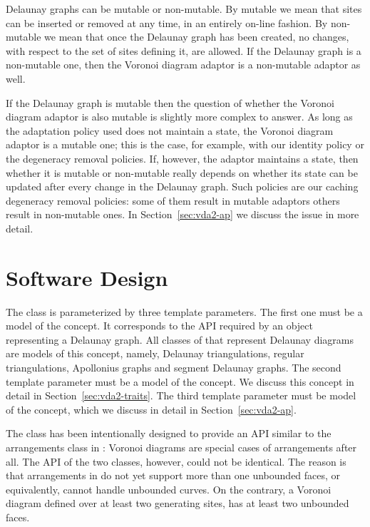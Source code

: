 Delaunay graphs can be mutable or non-mutable. By mutable we mean that
sites can be inserted or removed at any time, in an entirely on-line
fashion. By non-mutable we mean that once the Delaunay graph has been
created, no changes, with respect to the set of sites defining it,
are allowed. If the Delaunay graph is a non-mutable one, then the
Voronoi diagram adaptor is a non-mutable adaptor as well.

If the Delaunay graph is mutable then the question of whether the
Voronoi diagram adaptor is also mutable is slightly more complex to
answer. As long as the adaptation policy used does not maintain a
state, the Voronoi diagram adaptor is a mutable one; this is the case,
for example, with our identity policy or the degeneracy removal
policies. If, however, the adaptor maintains a state, then whether it
is mutable or non-mutable really depends on whether its state can be
updated after every change in the Delaunay graph. Such policies are
our caching degeneracy removal policies: some of them result in
mutable adaptors others result in non-mutable ones. In
Section~\ref{sec:vda2-ap} we discuss the issue in more detail.




\section{Software Design\label{sec:vda2-design}}

The  class is parameterized by
three template parameters. The first one must be a model of the
 concept. It corresponds to the API required by
an object representing a Delaunay graph. All classes of \cgal{} that
represent Delaunay diagrams are models of this concept, namely,
Delaunay triangulations, regular triangulations, Apollonius 
graphs and segment Delaunay graphs.
%
The second template parameter must be a model of the
 concept. We discuss this concept in detail in
Section~\ref{sec:vda2-traits}.
%
The third template parameter must be model of the
 concept, which we discuss in detail in
Section~\ref{sec:vda2-ap}.

The  class has been
intentionally designed to provide an API similar to the arrangements
class in \cgal: Voronoi diagrams are special cases of arrangements
after all. The API of the two classes, however, could not be
identical. The reason is that arrangements in \cgal{} do not yet support
more than one unbounded faces, or equivalently, cannot handle
unbounded curves. On the contrary, a Voronoi diagram defined over at
least two generating sites, has at least two unbounded faces.


